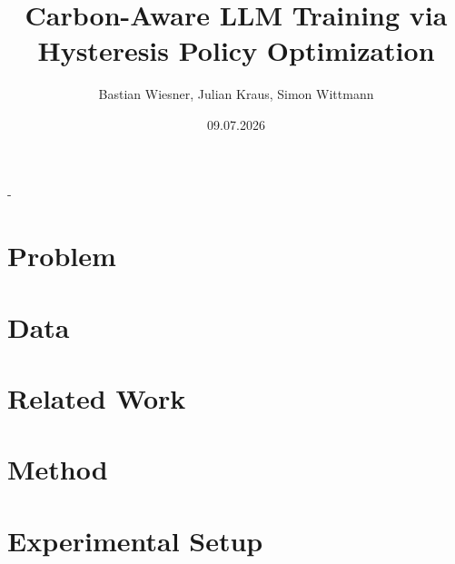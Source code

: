\documentclass[final]{beamer}
\title[Carbon-Aware LLM Training]{Carbon-Aware LLM Training
via\\Hysteresis Policy Optimization}
\author[TheGreenEpoch]{
  Bastian Wiesner, Julian Kraus, Simon Wittmann
}
\institute[FAU]{
  Friedrich-Alexander-Universit\"at Erlangen-N\"urnberg, Computer Science 7
}
\date{09.07.2026}
\begin{document}
\begin{frame}[t,titleimagenofooter]{-}
  \titlepage
\end{frame}

\section{Problem}





\section{Data}




\section{Related Work}



\section{Method}






\section{Experimental Setup}



\end{document}
